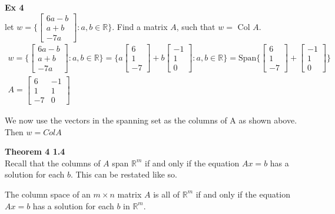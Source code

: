 \documentclass{article}
\begin{document}
   \textbf{Ex 4}\\
   let $ w = \{ \begin{bmatrix}
       6a-b\\
       a+b\\
       -7a
   \end{bmatrix} : a,b \in \mathbb{R} \} $. Find a matrix $ A $, such that $ w=$ Col $A $.
   \[
       \begin{gathered}
       w = \{ \begin{bmatrix}
           6a-b\\
           a+b\\
           -7a
       \end{bmatrix} :a,b \in \mathbb{R}\} = 
       \{ a\begin{bmatrix}
           6\\
           1\\
           -7
       \end{bmatrix} + b\begin{bmatrix}
           -1\\
           1\\
           0
       \end{bmatrix}: a,b \in \mathbb{R}\} = 
       \text{Span} \{ \begin{bmatrix}
           6\\
           1\\
           -7
       \end{bmatrix} + \begin{bmatrix}
           -1\\
           1\\
           0
       \end{bmatrix}\} \\
       A=
       \begin{bmatrix}
           6 &-1\\
           1 &1\\
           -7 &0
       \end{bmatrix}
       \end{gathered}
   \]

   We now use the vectors in the spanning set as the columns of A as shown above. Then $ w=ColA $ 

   \textbf{Theorem 4 1.4}\\
   Recall that the columns of $ A $ span $ \mathbb{R}^{m} $ if and only if the equation $ Ax=b $ has a solution for each $ b $. This can be restated like so. 
   
   The column space of an $ m \times n $ matrix $ A $ is all of $ \mathbb{R}^{m} $ if and only if the equation $ Ax=b $ has a solution for each $ b $ in $ \mathbb{R}^{m} $.
\end{document}
